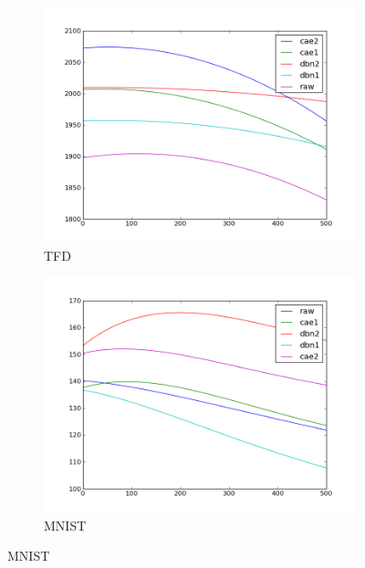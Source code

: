\begin{figure}
\centering

\begin{subfigure}{.45\textwidth}
\includegraphics[width=1.\textwidth]{article3/images/tfdfold1_degree2_new2.png}
\caption{TFD}
\end{subfigure}
\begin{subfigure}{.45\textwidth}
\includegraphics[width=1.\textwidth]{article3/images/mnist28_degree4dbnlegend.png}
\caption{MNIST}
\end{subfigure}


\end{figure}
